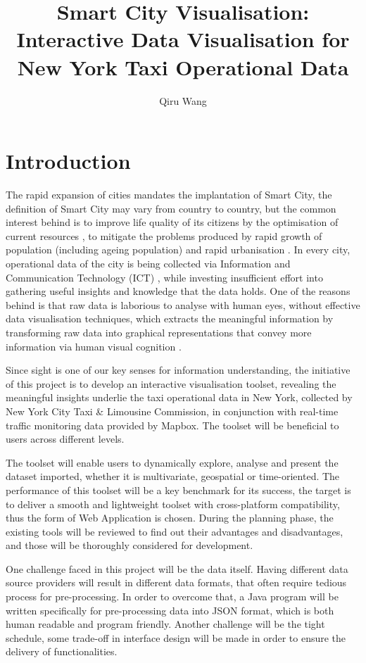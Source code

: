 \documentclass[doc,natbib]{apa6}
\title{Smart City Visualisation: Interactive Data Visualisation for New York Taxi Operational Data}
\author{Qiru Wang}
\affiliation{\href{mailto:689404@swansea.ac.uk}{689404@swansea.ac.uk} \\ Department of Science \\ Swansea University, Wales UK}
\begin{document}
\maketitle
\setlength{\parindent}{0pt}
\setlength{\parskip}{0.8em}
\newpage
\tableofcontents
\newpage
\setcounter{secnumdepth}{5}
\section{Introduction}

The rapid expansion of cities mandates the implantation of Smart City, the definition of Smart City may vary from country to country, but the common interest behind is to improve life quality of its citizens by the optimisation of current resources \citep{Lazaroiu2012}, to mitigate the problems produced by rapid growth of population (including ageing population) and rapid urbanisation \citep{Chourabi2011}. In every city, operational data of the city is being collected via Information and Communication Technology (ICT) \citep{Deakin2011}, while investing insufficient effort into gathering useful insights and knowledge that the data holds. One of the reasons behind is that raw data is laborious to analyse with human eyes, without effective data visualisation techniques, which extracts the meaningful information by transforming raw data into graphical representations that convey more information via human visual cognition \citep{Ward2010}. 

Since sight is one of our key senses for information understanding, the initiative of this project is to develop an interactive visualisation toolset, revealing the meaningful insights underlie the taxi operational data in New York, collected by New York City Taxi \& Limousine Commission, in conjunction with real-time traffic monitoring data provided by Mapbox. The toolset will be beneficial to users across different levels.

The toolset will enable users to dynamically explore, analyse and present the dataset imported, whether it is multivariate, geospatial or time-oriented. The performance of this toolset will be a key benchmark for its success, the target is to deliver a smooth and lightweight toolset with cross-platform compatibility, thus the form of Web Application is chosen. During the planning phase, the existing tools will be reviewed to find out their advantages and disadvantages, and those will be thoroughly considered for development.

One challenge faced in this project will be the data itself. Having different data source providers will result in different data formats, that often require tedious process for pre-processing. In order to overcome that, a Java program will be written specifically for pre-processing data into JSON format, which is both human readable and program friendly. Another challenge will be the tight schedule, some trade-off in interface design will be made in order to ensure the delivery of functionalities.
\end{document}
